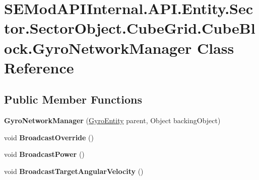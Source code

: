 \hypertarget{class_s_e_mod_a_p_i_internal_1_1_a_p_i_1_1_entity_1_1_sector_1_1_sector_object_1_1_cube_grid_1_1822c814d32081cd79efd93b6076f24a9}{}\section{S\+E\+Mod\+A\+P\+I\+Internal.\+A\+P\+I.\+Entity.\+Sector.\+Sector\+Object.\+Cube\+Grid.\+Cube\+Block.\+Gyro\+Network\+Manager Class Reference}
\label{class_s_e_mod_a_p_i_internal_1_1_a_p_i_1_1_entity_1_1_sector_1_1_sector_object_1_1_cube_grid_1_1822c814d32081cd79efd93b6076f24a9}
\subsection*{Public Member Functions}
\begin{DoxyCompactItemize}
\item 
\hypertarget{class_s_e_mod_a_p_i_internal_1_1_a_p_i_1_1_entity_1_1_sector_1_1_sector_object_1_1_cube_grid_1_1822c814d32081cd79efd93b6076f24a9_ababf11e3cd258ad4fcb3a4639ddcfd8b}{}{\bfseries Gyro\+Network\+Manager} (\hyperlink{class_s_e_mod_a_p_i_internal_1_1_a_p_i_1_1_entity_1_1_sector_1_1_sector_object_1_1_cube_grid_1_1_cube_block_1_1_gyro_entity}{Gyro\+Entity} parent, Object backing\+Object)\label{class_s_e_mod_a_p_i_internal_1_1_a_p_i_1_1_entity_1_1_sector_1_1_sector_object_1_1_cube_grid_1_1822c814d32081cd79efd93b6076f24a9_ababf11e3cd258ad4fcb3a4639ddcfd8b}

\item 
\hypertarget{class_s_e_mod_a_p_i_internal_1_1_a_p_i_1_1_entity_1_1_sector_1_1_sector_object_1_1_cube_grid_1_1822c814d32081cd79efd93b6076f24a9_a2a0747cb8ba42df32f11f4fb86ccf74a}{}void {\bfseries Broadcast\+Override} ()\label{class_s_e_mod_a_p_i_internal_1_1_a_p_i_1_1_entity_1_1_sector_1_1_sector_object_1_1_cube_grid_1_1822c814d32081cd79efd93b6076f24a9_a2a0747cb8ba42df32f11f4fb86ccf74a}

\item 
\hypertarget{class_s_e_mod_a_p_i_internal_1_1_a_p_i_1_1_entity_1_1_sector_1_1_sector_object_1_1_cube_grid_1_1822c814d32081cd79efd93b6076f24a9_a377ea2d27664cecf34f78a124eb14509}{}void {\bfseries Broadcast\+Power} ()\label{class_s_e_mod_a_p_i_internal_1_1_a_p_i_1_1_entity_1_1_sector_1_1_sector_object_1_1_cube_grid_1_1822c814d32081cd79efd93b6076f24a9_a377ea2d27664cecf34f78a124eb14509}

\item 
\hypertarget{class_s_e_mod_a_p_i_internal_1_1_a_p_i_1_1_entity_1_1_sector_1_1_sector_object_1_1_cube_grid_1_1822c814d32081cd79efd93b6076f24a9_ad8f329e26049e98be7cb2e368bbea34f}{}void {\bfseries Broadcast\+Target\+Angular\+Velocity} ()\label{class_s_e_mod_a_p_i_internal_1_1_a_p_i_1_1_entity_1_1_sector_1_1_sector_object_1_1_cube_grid_1_1822c814d32081cd79efd93b6076f24a9_ad8f329e26049e98be7cb2e368bbea34f}

\end{DoxyCompactItemize}
